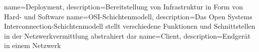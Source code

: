 {
        name=Deployment,
        description={Bereitstellung von Infrastruktur in Form von Hard- und Software}
}
{
        name=OSI-Schichtenmodell,
        description={Das Open Systems Interconnection-Schichtenmodell stellt verschiedene Funktionen und Schnittstellen in der Netzwerkvermittlung abstrahiert dar}
}
{
        name=Client,
        description={Endgerät in einem Netzwerk}
}
